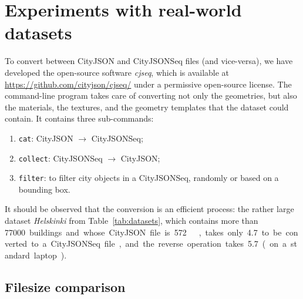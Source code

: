 \documentclass{isprs} %
\begin{document}
%
\section{Experiments with real-world datasets}%
\label{sec:experiments}


To convert between CityJSON and CityJSONSeq files (and vice-versa), we have developed the open-source software \emph{cjseq}, which is available at \url{https://github.com/cityjson/cjseq/} under a permissive open-source license.
The command-line program takes care of converting not only the geometries, but also the materials, the textures, and the geometry templates that the dataset could contain.
It contains three sub-commands: 
\begin{enumerate}
  \item \texttt{cat}: CityJSON $\rightarrow$ CityJSONSeq;
  \item \texttt{collect}: CityJSONSeq $\rightarrow$ CityJSON;
  \item \texttt{filter}: to filter city objects in a CityJSONSeq, randomly or based on a bounding box.
\end{enumerate}

It should be observed that the conversion is an efficient process: the rather large dataset \emph{Helskinki} from Table~\ref{tab:datasets}, which contains more than \qty{77000} buildings and whose CityJSON file is \qty{572}{\mega\byte}, takes only \qty{4.7}{\sec} to be converted to a CityJSONSeq file, and the reverse operation takes \qty{5.7}{\sec} (on a standard laptop).



\subsection{Filesize comparison}
\end{document}
